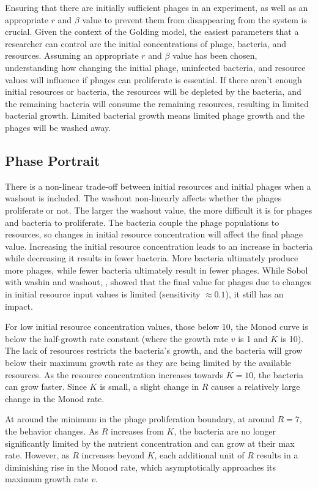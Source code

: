 Ensuring that there are initially sufficient phages in an experiment, as well as an appropriate $r$ and $\beta$ value to prevent them from disappearing from the system is crucial. 
Given the context of the Golding model, the easiest parameters that a researcher can control are the initial concentrations of phage, bacteria, and resources. 
Assuming an appropriate $r$ and $\beta$ value has been chosen, understanding how changing the initial phage, uninfected bacteria, and resource values will influence if phages can proliferate is essential. 
If there aren't enough initial resources or bacteria, the resources will be depleted by the bacteria, and the remaining bacteria will consume the remaining resources, resulting in limited bacterial growth. 
Limited bacterial growth means limited phage growth and the phages will be washed away. 

\subsection{Phase Portrait}
There is a non-linear trade-off between initial resources and initial phages when a washout is included. 
The washout non-linearly affects whether the phages proliferate or not. 
The larger the washout value, the more difficult it is for phages and bacteria to proliferate. 
The bacteria couple the phage populations to resources, so changes in initial resource concentration will affect the final phage value. 
Increasing the initial resource concentration leads to an increase in bacteria while decreasing it results in fewer bacteria.
More bacteria ultimately produce more phages, while fewer bacteria ultimately result in fewer phages.
While Sobol with washin and washout, , showed that the final value for phages due to changes in initial resource input values is limited (sensitivity $\approx 0.1$), it still has an impact. 

For low initial resource concentration values, those below $10$, the Monod curve is below the half-growth rate constant (where the growth rate $v$ is 1 and $K$ is 10). 
The lack of resources restricts the bacteria's growth, and the bacteria will grow below their maximum growth rate as they are being limited by the available resources. 
As the resource concentration increases towards $K=10$, the bacteria can grow faster. 
Since $K$ is small, a slight change in $R$ causes a relatively large change in the Monod rate. 

At around the minimum in the phage proliferation boundary, at around $R=7$, the behavior changes. 
As $R$ increases from $K$, the bacteria are no longer significantly limited by the nutrient concentration and can grow at their max rate.
However, as $R$ increases beyond $K$, each additional unit of $R$ results in a diminishing rise in the Monod rate, which asymptotically approaches its maximum growth rate $v$. 

